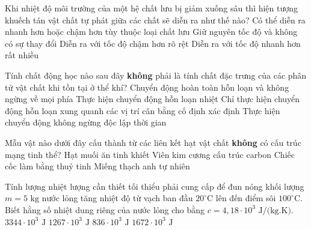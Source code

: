 \begin{ex}	Khi nhiệt độ môi trường của một hệ chất lưu bị giảm xuống sâu thì hiện tượng khuếch tán vật chất tự phát giữa các chất sẽ diễn ra như thế nào?
	\choice
	{Có thể diễn ra nhanh hơn hoặc chậm hơn tùy thuộc loại chất lưu}
	{Giữ nguyên tốc độ và không có sự thay đổi}
	{\True Diễn ra với tốc độ chậm hơn rõ rệt}
	{Diễn ra với tốc độ nhanh hơn rất nhiều}
\end{ex}

\begin{ex}	Tính chất động học nào sau đây \textbf{không} phải là tính chất đặc trưng của các phân tử vật chất khi tồn tại ở thể khí?
	\choice
	{Chuyển động hoàn toàn hỗn loạn và không ngừng về mọi phía}
	{Thực hiện chuyển động hỗn loạn nhiệt}
	{\True Chỉ thực hiện chuyển động hỗn loạn xung quanh các vị trí cân bằng cố định xác định}
	{Thực hiện chuyển động không ngừng độc lập thời gian}
\end{ex}

\begin{ex}	Mẫu vật nào dưới đây cấu thành từ các liên kết hạt vật chất \textbf{không} có cấu trúc mạng tinh thể?
	\choice
	{Hạt muối ăn tinh khiết}
	{Viên kim cương cấu trúc carbon}
	{\True Chiếc cốc làm bằng thuỷ tinh}
	{Miếng thạch anh tự nhiên}
\end{ex}

\begin{ex}	Tính lượng nhiệt lượng cần thiết tối thiểu phải cung cấp để đun nóng khối lượng $m = 5\text{ kg}$ nước lỏng tăng nhiệt độ từ vạch ban đầu $20^\circ\text{C}$ lên đến điểm sôi $100^\circ\text{C}$. Biết hằng số nhiệt dung riêng của nước lỏng cho bằng $c = 4,18 \cdot 10^{3}\text{ J/(kg.K)}$.
	\choice
	{$3344 \cdot 10^{3}\text{ J}$}
	{$1267 \cdot 10^{3}\text{ J}$}
	{$836 \cdot 10^{3}\text{ J}$}
	{\True $1672 \cdot 10^{3}\text{ J}$}
\end{ex}

